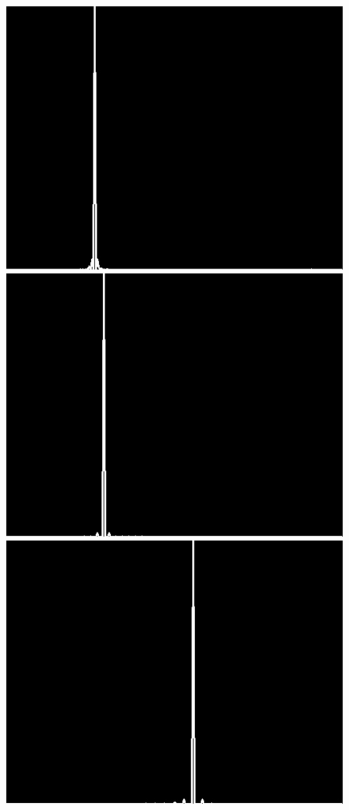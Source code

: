 \documentclass[12pt]{report}
\begin{document}
\begin{figure}[H]
\begin{center}
\includegraphics[scale=0.25]{../ImageRes/blockdct_transform_histo_0.jpg} 
\includegraphics[scale=0.25]{../ImageRes/blockdct_transform_histo_1.jpg} 
\includegraphics[scale=0.25]{../ImageRes/blockdct_transform_histo_2.jpg} 

\end{center}
\end{figure}
\end{document}
